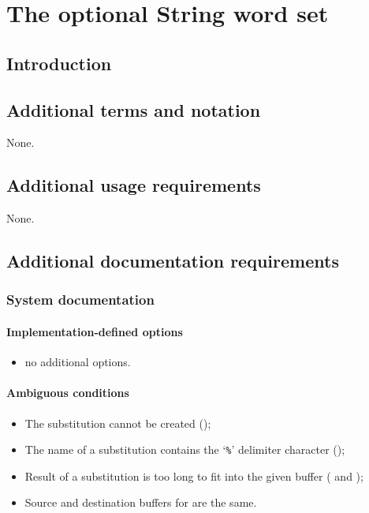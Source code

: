 \chapter{The optional String word set} %

\section{Introduction} %

\section{Additional terms and notation} %

None.

\section{Additional usage requirements} %

None.

\section{Additional documentation requirements} %
\label{string:document}

\subsection{System documentation}
\subsubsection{Implementation-defined options}
\begin{itemize}
\item no additional options.
\end{itemize}

\subsubsection{Ambiguous conditions}
\begin{itemize}
\item The substitution cannot be created ();
\item The name of a substitution contains the `\texttt{\%}' delimiter character ();
\item Result of a substitution is too long to fit into the given buffer ( and );
\item Source and destination buffers for  are the same.
\end{itemize}

